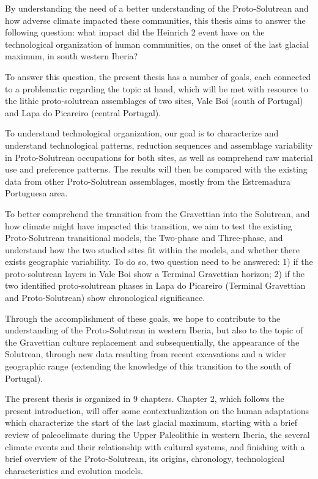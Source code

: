 \documentclass[12pt,twoside]{reedthesis}
\begin{document}
By understanding the need of a better understanding of the Proto-Solutrean and how adverse climate impacted these communities, this thesis aims to answer the following question: what impact did the Heinrich 2 event have on the technological organization of human communities, on the onset of the last glacial maximum, in south western Iberia?

To answer this question, the present thesis has a number of goals, each connected to a problematic regarding the topic at hand, which will be met with resource to the lithic proto-solutrean assemblages of two sites, Vale Boi (south of Portugal) and Lapa do Picareiro (central Portugal).

To understand technological organization, our goal is to characterize and understand technological patterns, reduction sequences and assemblage variability in Proto-Solutrean occupations for both sites, as well as comprehend raw material use and preference patterns. The results will then be compared with the existing data from other Proto-Solutrean assemblages, mostly from the Estremadura Portuguesa area.

To better comprehend the transition from the Gravettian into the Solutrean, and how climate might have impacted this transition, we aim to test the existing Proto-Solutrean transitional models, the Two-phase and Three-phase, and understand how the two studied sites fit within the models, and whether there exists geographic variability. To do so, two question need to be answered: 1) if the proto-solutrean layers in Vale Boi show a Terminal Gravettian horizon; 2) if the two identified proto-solutrean phases in Lapa do Picareiro (Terminal Gravettian and Proto-Solutrean) show chronological significance.

Through the accomplishment of these goals, we hope to contribute to the understanding of the Proto-Solutrean in western Iberia, but also to the topic of the Gravettian culture replacement and subsequentially, the appearance of the Solutrean, through new data resulting from recent excavations and a wider geographic range (extending the knowledge of this transition to the south of Portugal).

The present thesis is organized in 9 chapters. Chapter 2, which follows the present introduction, will offer some contextualization on the human adaptations which characterize the start of the last glacial maximum, starting with a brief review of paleoclimate during the Upper Paleolithic in western Iberia, the several climate events and their relationship with cultural systems, and finishing with a brief overview of the Proto-Solutrean, its origins, chronology, technological characteristics and evolution models.
\end{document}
